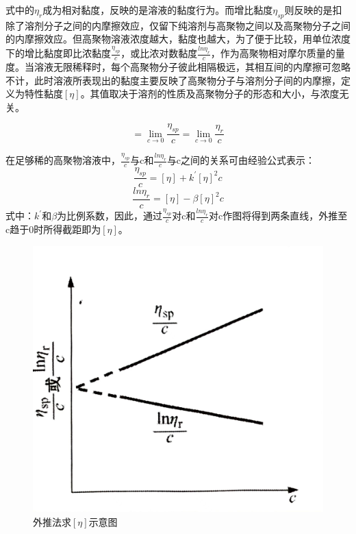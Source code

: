 \documentclass[12pt,hyperref,a4paper,UTF8]{ctexart}
\begin{document}
式中的$\eta _r$成为相对黏度，反映的是溶液的黏度行为。而增比黏度$\eta _ {sp}$则反映的是扣除了溶剂分子之间的内摩擦效应，仅留下纯溶剂与高聚物之间以及高聚物分子之间的内摩擦效应。但高聚物溶液浓度越大，黏度也越大，为了便于比较，用单位浓度下的增比黏度即比浓黏度$\frac{\eta _{sp}}{c}$，或比浓对数黏度$\frac{ln \eta_r}{c}$，作为高聚物相对摩尔质量的量度。当溶液无限稀释时，每个高聚物分子彼此相隔极远，其相互间的内摩擦可忽略不计，此时溶液所表现出的黏度主要反映了高聚物分子与溶剂分子间的内摩擦，定义为特性黏度$[\eta]$。其值取决于溶剂的性质及高聚物分子的形态和大小，与浓度无关。

\begin{equation}
    [\eta] = \lim_{c \to 0}\frac{\eta _{sp}}{c} = \lim_{c \to 0}\frac{\eta _{r}}{c}
\end{equation}

在足够稀的高聚物溶液中，$\frac{\eta _{sp}}{c}$与c和$\frac{ln \eta_r}{c}$与c之间的关系可由经验公式表示：
\begin{equation}
    \frac{\eta _{sp}}{c} = [\eta] + k^{'} [\eta]^2 c
\end{equation}
\begin{equation}
    \frac{ln \eta_r}{c} = [\eta] - \beta [\eta]^2 c
\end{equation}
式中：$k^{'}$和$\beta$为比例系数，因此，通过$\frac{\eta _{sp}}{c}$对c和$\frac{ln \eta_r}{c}$对c作图将得到两条直线，外推至c趋于0时所得截距即为$[\eta]$。

\begin{figure}[htp]
    \centering
    \includegraphics[width=0.5\linewidth]{WechatIMG595.jpg}
    \caption{外推法求$[\eta]$示意图}
    \label{fig:enter-label1}
\end{figure}
\end{document}
